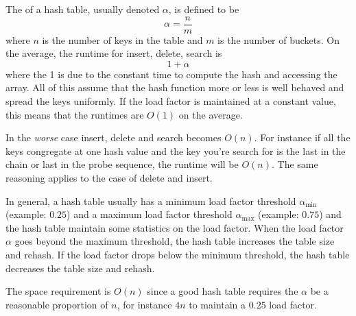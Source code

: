 
The  of a hash table, usually denoted $\alpha$, 
is defined to be
\[
\alpha = \frac{n}{m}
\]
where $n$ is the number of keys in the table and $m$ is the number of buckets.
On the average, the runtime for insert, delete, search is
\[
1 + \alpha
\]
where the 1 is due to the constant time to compute the hash and accessing the array.
All of this assume that the hash function more or less is well behaved and spread
the keys uniformly.
If the load factor is maintained at a constant value, this means
that the runtimes are $O(1)$ on the average.

In the \textit{worse} case 
insert, delete and search becomes $O(n)$.
For instance if all the keys congregate at one hash value and the 
key you're search for is the last in the chain or last in the probe sequence,
the runtime will be $O(n)$.
The same reasoning applies to the case of delete and insert.

In general, a hash table usually has a minimum load factor threshold
$\alpha_{\operatorname{min}}$ (example: $0.25$)
and a maximum load factor threshold
$\alpha_{\operatorname{max}}$ (example: $0.75$)
and the hash table maintain some statistics on the load factor.
When the load factor $\alpha$ goes beyond the maximum threshold, 
the hash table increases the table size and rehash.
If the load factor drops below the minimum threshold, the hash table
decreases the table size and rehash.

The space requirement is $O(n)$ since 
a good hash table requires the $\alpha$ be a reasonable
proportion of $n$, for instance $4n$ to maintain a $0.25$ load factor.



\newpage
